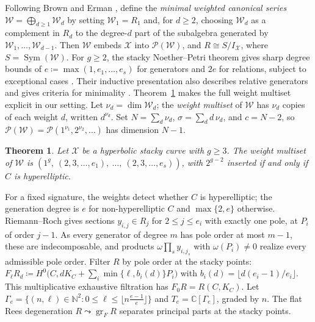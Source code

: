 \documentclass[11pt,reqno]{amsart}
\newtheorem{theorem}[lemma]{Theorem}
\theoremstyle{remark}
\newcommand{\Sym}{\operatorname{Sym}} %
\newcommand{\CC}{\mathbb{C}}
\newcommand{\NN}{\mathbb{N}}
\newcommand{\cP}{\mathcal{P}}
\newcommand{\cW}{\mathcal{W}}
\newcommand{\cX}{\mathcal{X}}
\begin{document}
Following Brown and Erman \cite[\S~3.1]{brownErman25}, define the \emph{minimal weighted canonical series} $\cW=\bigoplus_{d\geq1}\cW_d$ by setting $\cW_1=R_1$ and, for $d\geq2$, choosing $\cW_d$ as a complement in $R_d$ to the degree-$d$ part of the subalgebra generated by $\cW_1,\ldots,\cW_{d-1}$. Then $\cW$ embeds $\cX$ into $\cP(\cW)$, and $R\cong S/I_{\cX}$, where $S=\Sym(\cW)$. For $g\geq2$, the stacky Noether--Petri theorem gives sharp degree bounds of $e\coloneqq\max(1,e_1,\ldots,e_s)$ for generators and $2e$ for relations, subject to exceptional cases
\cite[Cor.~1.4.2]{voightZurieckBrown22}. Their inductive presentation also describes relative generators and gives criteria for minimality \cite[Thm.~8.3.1(a),(d)]{voightZurieckBrown22}. Theorem~\ref{conj:weights} makes the full weight multiset explicit in our setting. Let $\nu_d = \dim \cW_d$; the \emph{weight multiset} of $\cW$ has $\nu_d$ copies of each weight $d$, written $d^{\nu_d}$. Set $N = \sum_d \nu_d$, $\sigma = \sum_d d\,\nu_d$, and $c = N-2$, so $\cP(\cW)=\cP(1^{\nu_1},2^{\nu_2},\ldots)$ has dimension $N-1$.

\begin{theorem}\label{conj:weights}
Let $\cX$ be a hyperbolic stacky curve with $g\geq3$. The weight multiset of $\cW$ is $(1^{g},\ (2,3,\ldots,e_1),\ \ldots,\ (2,3,\ldots,e_s))$, with $2^{g-2}$ inserted if and only if $C$ is hyperelliptic.
\end{theorem}

For a fixed signature, the weights detect whether $C$ is hyperelliptic; the generation degree is $e$ for non-hyperelliptic $C$ and $\max\{2,e\}$ otherwise. Riemann--Roch gives sections $y_{i,j}\in R_j$ for $2\leq j \leq e_i$ with exactly one pole, at $P_i$ of order $j-1$. As every generator of degree $m$ has pole order at most $m-1$, these are indecomposable, and products $\omega\prod_sy_{i,j_s}$ with $\omega(P_i)\ne0$ realize every admissible pole order. Filter $R$ by pole order at the stacky points: $F_{\ell}R_d \coloneqq H^0\big(C,dK_C+\sum_i\min\{\ell,b_i(d)\}P_i\big)$ with $b_i(d)=\lfloor d(e_i-1)/e_i\rfloor$. This multiplicative exhaustive filtration has $F_{0}R = R(C, K_C)$. Let $\Gamma_e=\{(n,\ell)\in\NN^2:0\leq\ell\leq\lfloor n\tfrac{e-1}{e}\rfloor\}$ and $T_e=\CC[\Gamma_e]$, graded by $n$. The flat Rees degeneration $R\leadsto\operatorname{gr}_F R$ separates principal parts at the stacky points.


\end{document}
